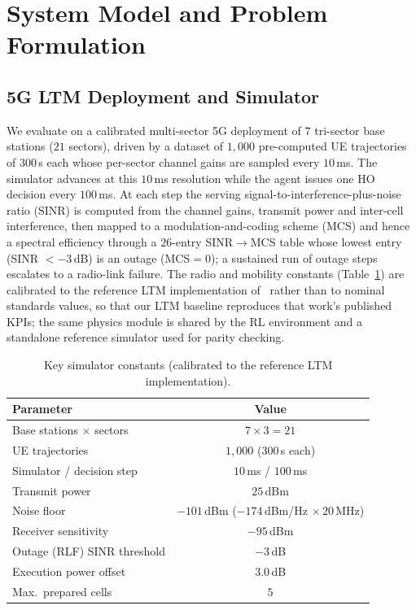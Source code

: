 \documentclass[conference]{IEEEtran}
\begin{document}
\section{System Model and Problem Formulation}
\label{sec:model}

\subsection{5G LTM Deployment and Simulator}
We evaluate on a calibrated multi-sector 5G deployment of $7$ tri-sector base
stations ($21$ sectors), driven by a dataset of $1{,}000$ pre-computed UE
trajectories of $300$\,s each whose per-sector channel gains are sampled every
$10$\,ms. The simulator advances at this $10$\,ms resolution while the agent
issues one HO decision every $100$\,ms. At each step the serving
signal-to-interference-plus-noise ratio (SINR) is computed from the channel
gains, transmit power and inter-cell interference, then mapped to a
modulation-and-coding scheme (MCS) and hence a spectral efficiency through a
$26$-entry SINR$\to$MCS table whose lowest entry (SINR $<-3$\,dB) is an outage
(MCS$=0$); a sustained run of outage steps escalates to a radio-link failure.
The radio and mobility constants (Table~\ref{tab:sysparams}) are calibrated to
the reference LTM implementation of~\cite{cmab_ho} rather than to nominal
standards values, so that our LTM baseline reproduces that work's published
KPIs; the same physics module is shared by the RL environment and a standalone
reference simulator used for parity checking.

\begin{table}[htbp]
\caption{Key simulator constants (calibrated to the reference LTM implementation).}
\label{tab:sysparams}
\begin{center}
\begin{tabular}{|l|c|}
\hline
\textbf{Parameter} & \textbf{Value} \\
\hline
Base stations $\times$ sectors      & $7 \times 3 = 21$ \\
UE trajectories                     & $1{,}000$ ($300$\,s each) \\
Simulator / decision step           & $10$\,ms / $100$\,ms \\
Transmit power                      & $25$\,dBm \\
Noise floor                         & $-101$\,dBm ($-174$\,dBm/Hz $\times\,20$\,MHz) \\
Receiver sensitivity                & $-95$\,dBm \\
Outage (RLF) SINR threshold         & $-3$\,dB \\
Execution power offset              & $3.0$\,dB \\
Max.\ prepared cells                & $5$ \\
\hline
\end{tabular}
\end{center}
\end{table}
\end{document}
